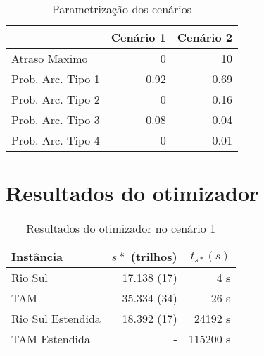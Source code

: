 \begin{table}
\caption{Parametrização dos cenários}\label{tab:params}
\begin{center}


\begin{tabular}{l|rr}
\hline

 & Cenário 1 & Cenário 2 \\
 \hline
 Atraso Maximo & 0 & 10 \\
 Prob. Arc. Tipo 1 & 0.92 & 0.69\\ 
 Prob. Arc. Tipo 2 & 0 & 0.16\\
 Prob. Arc. Tipo 3 & 0.08 & 0.04 \\
 Prob. Arc. Tipo 4 & 0 & 0.01 \\
  
\hline

\end{tabular}
\end{center}
\end{table}

\section{Resultados do otimizador} \label{result:otimizador}

\begin{table}[ht]
\caption{Resultados do otimizador no cenário 1}\label{tab:otimizadorcenario1}
\begin{center}

\begin{tabular}{l |r r}
\hline

Instância 			& $s*$ (trilhos) & $t_{s*}(s)$
\\
\hline

Rio Sul 			& 17.138 (17) & 4 s		 	\\
TAM     			& 35.334 (34) & 26 s	 	\\
Rio Sul Estendida 	& 18.392 (17) & 24192 s	 	\\
TAM Estendida 		& - 		  & 115200 s 	\\

\hline
\end{tabular}
\end{center}
\end{table}


